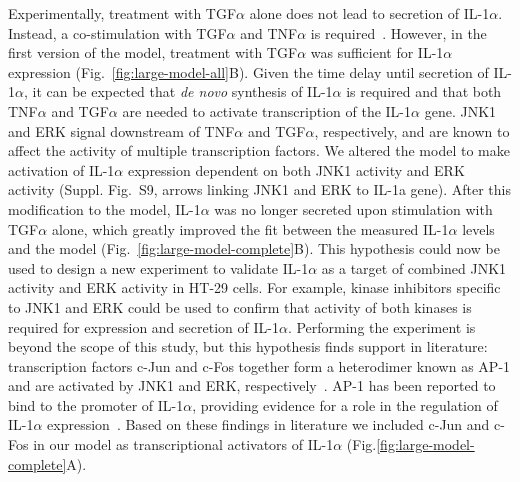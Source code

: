 \documentclass{bmcart}
\begin{document}
Experimentally,
treatment with TGF$\alpha$ alone does not lead to secretion of IL-1$\alpha$. Instead, a co-stimulation with
TGF$\alpha$ and TNF$\alpha$ is required~\cite{pathway-autocrine}.
However, in the first version of the model, treatment with TGF$\alpha$ was sufficient for
IL-1$\alpha$ expression (Fig.~\ref{fig:large-model-all}B). Given the time delay until secretion of IL-1$\alpha$, it can be
expected that \emph{de novo} synthesis of IL-1$\alpha$ is required and that both
TNF$\alpha$ and TGF$\alpha$ are needed to activate transcription of the IL-1$\alpha$ gene.
JNK1 and ERK signal downstream of TNF$\alpha$ and TGF$\alpha$, respectively, and are known
to affect the activity of multiple transcription factors. We altered the model to make
activation of IL-1$\alpha$ expression dependent on both JNK1 activity and ERK activity
(Suppl. Fig.~S9, %
arrows linking {\sf JNK1} and {\sf ERK} to {\sf IL-1a gene}).
After this modification to the model, IL-1$\alpha$ was no longer secreted
upon stimulation with TGF$\alpha$ alone, which greatly improved the fit between the measured IL-1$\alpha$
levels and the model (Fig.~\ref{fig:large-model-complete}B). This hypothesis could now be used to
design a new experiment to validate IL-1$\alpha$ as a target of combined JNK1 activity and ERK activity in
HT-29 cells. For example, kinase inhibitors specific to JNK1 and ERK could be used to confirm that activity of
both kinases is required for expression and secretion of IL-1$\alpha$. Performing the experiment is beyond
the scope of this study, but this hypothesis finds support in literature:
transcription factors c-Jun and c-Fos together
form a heterodimer known as AP-1 and are activated by JNK1 and ERK,
respectively~\cite{jnk-signaling,cfos-cjun}. AP-1 has been reported to bind to the
promoter of IL-1$\alpha$, providing evidence for a role in the regulation of IL-1$\alpha$
expression~\cite{ap1-il1a}. Based on these findings in literature we included c-Jun and
c-Fos in our model as transcriptional activators of IL-1$\alpha$ (Fig.\ref{fig:large-model-complete}A).
\end{document}

